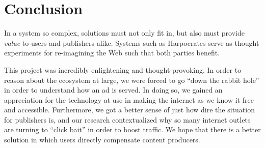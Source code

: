 \section{Conclusion}
In a system so complex, solutions must not only fit in, but also must provide \textit{value} to users and publishers alike.
Systems such as Harpocrates serve as thought experiments for re-imagining the Web such that both parties benefit.

This project was incredibly enlightening and thought-provoking.
In order to reason about the ecosystem at large, we were forced to go ``down the rabbit hole'' in order to understand how an ad is served.
In doing so, we gained an appreciation for the technology at use in making the internet as we know it free and accessible.
Furthermore, we got a better sense of just how dire the situation for publishers is, and our research contextualized why so many internet outlets are turning to ``click bait'' in order to boost traffic.
We hope that there is a better solution in which users directly compensate content producers.
